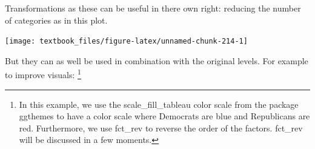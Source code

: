 \documentclass[]{tufte-book}
\newenvironment{Shaded}{}{}
\newcommand{\DataTypeTok}[1]{\textcolor[rgb]{0.56,0.13,0.00}{#1}}
\newcommand{\KeywordTok}[1]{\textcolor[rgb]{0.00,0.44,0.13}{\textbf{#1}}}
\newcommand{\NormalTok}[1]{#1}
\newcommand{\OperatorTok}[1]{\textcolor[rgb]{0.40,0.40,0.40}{#1}}
\newcommand{\StringTok}[1]{\textcolor[rgb]{0.25,0.44,0.63}{#1}}
\begin{document}
\begin{Shaded}
\end{Shaded}

Transformations as these can be useful in there own right: reducing the number of categories as in this plot.

\begin{Shaded}
\end{Shaded}

\texttt{[image: textbook\_files/figure-latex/unnamed-chunk-214-1]}

But they can as well be used in combination with the original levels. For example to improve visuals: \footnote{In this example, we use the scale\_fill\_tableau color scale from the package ggthemes to have a color scale where Democrats are blue and Republicans are red. Furthermore, we use fct\_rev to reverse the order of the factors. fct\_rev will be discussed in a few moments.}
\end{document}

